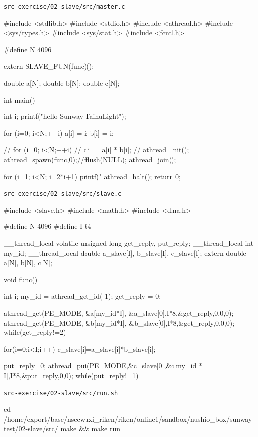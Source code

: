 \verb`src-exercise/02-slave/src/master.c`
\begin{code}
#include <stdlib.h>
#include <stdio.h>
#include <athread.h>
#include <sys/types.h>
#include <sys/stat.h>
#include <fcntl.h>

#define N 4096


extern SLAVE_FUN(func)();

double a[N];
double b[N];
double c[N];

int main() {
  int i;
  printf("hello Sunway TaihuLight\n");

  for (i=0; i<N;++i){
    a[i] = i;
    b[i] = i;
  }

  // for (i=0; i<N;++i){
  //   c[i] = a[i] * b[i];
  // }
  athread_init();
  athread_spawn(func,0);//fflush(NULL);
  athread_join();

  for (i=1; i<N; i=2*i+1){
    printf("%
  }
  athread_halt();
  return 0;
}

\end{code}

\verb`src-exercise/02-slave/src/slave.c`
\begin{code}
#include <slave.h>
#include <math.h>
#include <dma.h>

#define N 4096
#define I 64

__thread_local volatile unsigned long get_reply, put_reply;
__thread_local int my_id;
__thread_local double a_slave[I], b_slave[I], c_slave[I];
extern double a[N], b[N], c[N];

void func() {
  int i;
  my_id = athread_get_id(-1);
  get_reply = 0;

  athread_get(PE_MODE, &a[my_id*I], &a_slave[0],I*8,&get_reply,0,0,0);
  athread_get(PE_MODE, &b[my_id*I], &b_slave[0],I*8,&get_reply,0,0,0);
  while(get_reply!=2) {}

  for(i=0;i<I;i++){
    c_slave[i]=a_slave[i]*b_slave[i];
  }

  put_reply=0;
  athread_put(PE_MODE,&c_slave[0],&c[my_id * I],I*8,&put_reply,0,0);
  while(put_reply!=1) {}

}

\end{code}

\verb`src-exercise/02-slave/src/run.sh`
\begin{code}

cd /home/export/base/nsccwuxi_riken/riken/online1/sandbox/nushio_box/sunway-test/02-slave/src/
make && make run
    
\end{code}

